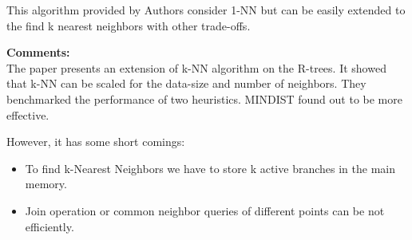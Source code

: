 \documentclass[a4paper,12pt, twoside]{article}
\begin{document}
This algorithm provided by Authors consider 1-NN but can be easily extended to the find k nearest neighbors with other trade-offs. 

\textbf{Comments:}\\
The paper presents an extension of k-NN algorithm on the R-trees. It showed that k-NN can be scaled for the data-size and number of neighbors. They benchmarked the performance of two heuristics. MINDIST found out to be more effective.

However, it has some short comings:
\begin{itemize}
	\item To find k-Nearest Neighbors we have to store k active branches in the main memory.
	
	\item Join operation or common neighbor queries of different points can be not efficiently.

\end{itemize}
\end{document}
